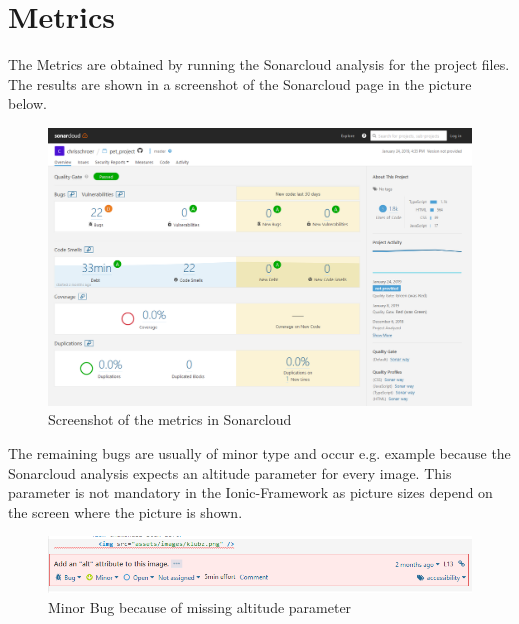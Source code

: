 \documentclass[12pt]{article}
\begin{document}
\newpage
\section{Metrics}
The Metrics are obtained by running the Sonarcloud analysis for the project files. The results are shown in a screenshot of the Sonarcloud page in the picture below.
\begin{figure}[H]
  \centering
    \includegraphics[width=1\textwidth]{figures/Sonarcloud.png}
    \caption{Screenshot of the metrics in Sonarcloud}
\end{figure}


The remaining bugs are usually of minor type and occur e.g. example because the Sonarcloud analysis expects an altitude parameter for every image. This parameter is not mandatory in the Ionic-Framework as picture sizes depend on the screen where the picture is shown.
\begin{figure}[H]
  \centering
    \includegraphics[width=1\textwidth]{figures/BugAlt.png}
    \caption{Minor Bug because of missing altitude parameter}
\end{figure}
\end{document}
